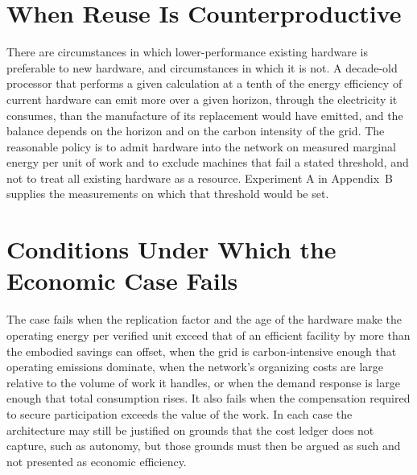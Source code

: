 \section{When Reuse Is Counterproductive}

There are circumstances in which lower-performance existing hardware is preferable to new hardware, and circumstances in which it is not. A decade-old processor that performs a given calculation at a tenth of the energy efficiency of current hardware can emit more over a given horizon, through the electricity it consumes, than the manufacture of its replacement would have emitted, and the balance depends on the horizon and on the carbon intensity of the grid. The reasonable policy is to admit hardware into the network on measured marginal energy per unit of work and to exclude machines that fail a stated threshold, and not to treat all existing hardware as a resource. Experiment A in Appendix~B supplies the measurements on which that threshold would be set.

\section{Conditions Under Which the Economic Case Fails}

The case fails when the replication factor and the age of the hardware make the operating energy per verified unit exceed that of an efficient facility by more than the embodied savings can offset, when the grid is carbon-intensive enough that operating emissions dominate, when the network's organizing costs are large relative to the volume of work it handles, or when the demand response is large enough that total consumption rises. It also fails when the compensation required to secure participation exceeds the value of the work. In each case the architecture may still be justified on grounds that the cost ledger does not capture, such as autonomy, but those grounds must then be argued as such and not presented as economic efficiency.
